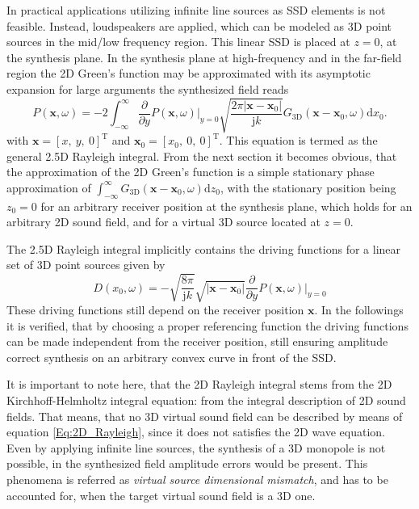 \documentclass[12pt,a4paper]{article}
\newcommand{\td}{\mathrm{d}}
\newcommand{\ti}{\mathrm{j}}
\newcommand{\vx}{\mathbf{x}}
\newcommand{\vxo}{\mathbf{x}_0}
\begin{document}
In practical applications utilizing infinite line sources as SSD elements is not feasible. Instead, loudspeakers are applied, which can be modeled as 3D point sources in the mid/low frequency region. This linear SSD is placed at $z=0$, at the synthesis plane. In the synthesis plane at high-frequency and in the far-field region the 2D Green's function may be approximated with its asymptotic expansion for large arguments the synthesized field reads
\begin{equation}
P(\vx,\omega) = 
-2 \int_{-\infty}^{\infty} \frac{\partial}{\partial y} \left. P(\vx,\omega) \right|_{y = 0} \sqrt{\frac{2\pi |\vx-\vxo|}{\ti k}} G_{3\mathrm{D}}(\vx - \vxo,\omega) \td x_0.
\label{Eq:2.5D_Rayleigh}
\end{equation}
with $\vx = [x,\ y,\ 0]^{\mathrm{T}}$ and $\vxo = [x_0,\ 0,\ 0]^{\mathrm{T}}$. This equation is termed as the general 2.5D Rayleigh integral. From the next section it becomes obvious, that the approximation of the 2D Green's function is a simple stationary phase approximation of $\int_{-\infty}^{\infty} G_{3\mathrm{D}}(\vx - \vxo,\omega) \td z_0$, with the stationary position being $z_0 = 0$ for an arbitrary receiver position at the synthesis plane, which holds for an arbitrary 2D sound field, and for a virtual 3D source located at $z=0$.

The 2.5D Rayleigh integral implicitly contains the driving functions for a linear set of 3D point sources given by 
\begin{equation}
D(x_0,\omega) = 
- \sqrt{\frac{8\pi}{\ti k}} \sqrt{|\vx-\vxo|} \frac{\partial}{\partial y} \left. P(\vx,\omega) \right|_{y = 0}
\label{Eq:2_5D_driv_fun_implicit}
\end{equation}
These driving functions still depend on the receiver position $\vx$. In the followings it is verified, that by choosing a proper referencing function the driving functions can be made independent from the receiver position, still ensuring amplitude correct synthesis on an arbitrary convex curve in front of the SSD.

\vspace{3mm}
It is important to note here, that the 2D Rayleigh integral stems from the 2D Kirchhoff-Helmholtz integral equation: from the integral description of 2D sound fields. That means, that no 3D virtual sound field can be described by means of equation \eqref{Eq:2D_Rayleigh}, since it does not satisfies the 2D wave equation. Even by applying infinite line sources, the synthesis of a 3D monopole is not possible, in the synthesized field amplitude errors would be present. This phenomena is referred as \emph{virtual source dimensional mismatch}, and has to be accounted for, when the target virtual sound field is a 3D one.
\end{document}
